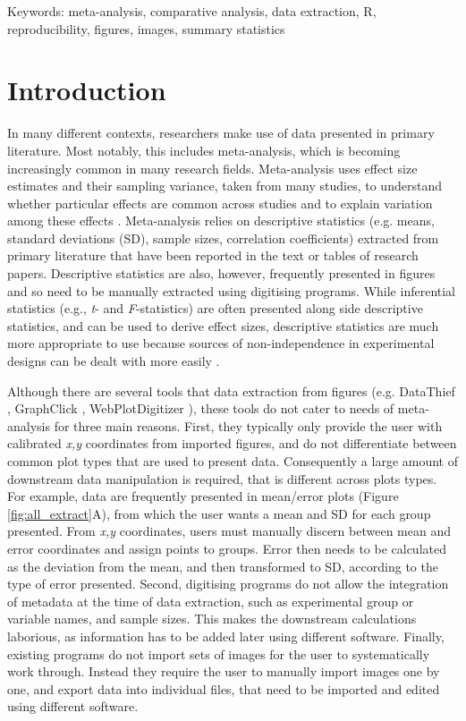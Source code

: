 \documentclass[12pt]{article}
\let\proglang=\textsf
\begin{document}
 Keywords: meta-analysis, comparative analysis, data extraction, \proglang{R}, reproducibility, figures, images, summary statistics


\clearpage



\section{Introduction}

In many different contexts, researchers make use of data presented in primary literature. Most notably, this includes meta-analysis, which is becoming increasingly common in many research fields. Meta-analysis uses effect size estimates and their sampling variance, taken from many studies, to understand whether particular effects are common across studies and to explain variation among these effects \citep{Glass1976,Koricheva2013,Naka2017}. Meta-analysis relies on descriptive statistics (e.g. means, standard deviations (SD), sample sizes, correlation coefficients) extracted from primary literature that have been reported in the text or tables of research papers. Descriptive statistics are also, however, frequently presented in figures and so need to be manually extracted using digitising programs. While inferential statistics (e.g., \textit{t}- and \textit{F}-statistics) are often presented along side descriptive statistics, and can be used to derive effect sizes, descriptive statistics are much more appropriate to use because sources of non-independence in experimental designs can be dealt with more easily \citep{Noble2017}. 

Although there are several tools that data extraction from figures (e.g. \proglang{DataThief} \citep{DataThief}, \proglang{GraphClick} \citep{GraphClick}, \proglang{WebPlotDigitizer} \citep{WebPlotDigitizer}), these tools do not cater to needs of meta-analysis for three main reasons. First, they typically only provide the user with calibrated \textit{x,y} coordinates from imported figures, and do not differentiate between common plot types that are used to present data. Consequently a large amount of downstream data manipulation is required, that is different across plots types. For example, data are frequently presented in mean/error plots (Figure \ref{fig:all_extract}A), from which the user wants a mean and SD for each group presented. From \textit{x,y} coordinates, users must manually discern between mean and error coordinates and assign points to groups. Error then needs to be calculated as the deviation from the mean, and then transformed to SD, according to the type of error presented. Second, digitising programs do not allow the integration of metadata at the time of data extraction, such as experimental group or variable names, and sample sizes. This makes the downstream calculations laborious, as information has to be added later using different software. Finally, existing programs do not import sets of images for the user to systematically work through. Instead they require the user to manually import images one by one, and export data into individual files, that need to be imported and edited using different software. 
\end{document}
